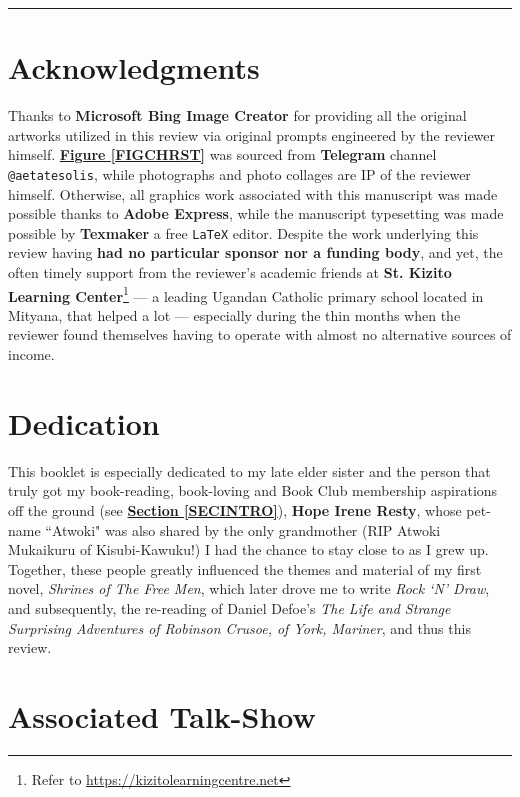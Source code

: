 \documentclass[a4paper]{article}
\begin{document}
\noindent\rule{\textwidth}{0.4pt}

\section{Acknowledgments}


Thanks to \textbf{Microsoft Bing Image Creator} for providing all the original artworks utilized in this review via original prompts engineered by the reviewer himself. \textbf{\hyperref[FIGCHRST]{Figure \ref{FIGCHRST}}} was sourced from \textbf{Telegram} channel \texttt{@aetatesolis}, while photographs and photo collages are IP of the reviewer himself. Otherwise, all graphics work associated with this manuscript was made possible thanks to \textbf{Adobe Express}, while the manuscript typesetting was made possible by \textbf{Texmaker} a free \texttt{LaTeX} editor. Despite the work underlying this review having \textbf{had no particular sponsor nor a funding body}, and yet, the often timely support from the reviewer's academic friends at \textbf{St. Kizito Learning Center}\footnote{Refer to \url{https://kizitolearningcentre.net}} --- a leading Ugandan Catholic primary school located in Mityana, that helped a lot --- especially during the thin months when the reviewer found themselves having to operate with almost no alternative sources of income.



\section{Dedication}

This booklet is especially dedicated to my late elder sister and the person that truly got my book-reading, book-loving and Book Club membership aspirations off the ground (see \textbf{\hyperref[SECINTRO]{Section \ref{SECINTRO}}}), \textbf{Hope Irene Resty}, whose pet-name ``Atwoki" was also shared by the only grandmother (RIP Atwoki Mukaikuru of Kisubi-Kawuku!) I had the chance to stay close to as I grew up. Together, these people greatly influenced the themes and material of my first novel, \textit{Shrines of The Free Men}, which later drove me to write \textit{Rock `N' Draw}, and subsequently, the re-reading of Daniel Defoe's \textit{The Life and Strange Surprising Adventures of Robinson Crusoe, of York, Mariner}, and thus this review.


\section{Associated Talk-Show}
\end{document}
